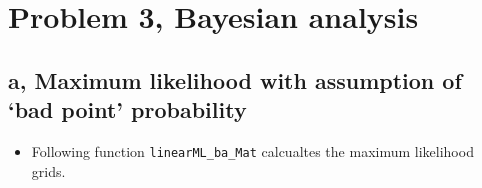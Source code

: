 \documentclass{article}
\newlength{\cellleftmargin}
\newlength{\smallerfontscale}
\def\smaller{\fontsize{\smallerfontscale}{\smallerfontscale}\selectfont}
\begin{document}
\par\vspace{1\smallerfontscale}%
    \begin{addmargin}[\cellleftmargin]{0em}%
    {\smaller%
    \vspace{-1\smallerfontscale}%
    
    \begin{center}
    \end{center}
    { \hspace*{\fill} \\}
    }%
    \end{addmargin}%
    \begin{addmargin}[\cellleftmargin]{0em}%
    {\smaller%
    \vspace{-1\smallerfontscale}%
    
    \begin{center}
    \end{center}
    { \hspace*{\fill} \\}
    }%
    \end{addmargin}%
    \section{Problem 3, Bayesian
analysis}\label{problem-3-bayesian-analysis}

\subsection{a, Maximum likelihood with assumption of `bad point'
probability}\label{a-maximum-likelihood-with-assumption-of-bad-point-probability}

\begin{itemize}
\itemsep1pt\parskip0pt
\item
  Following function \texttt{linearML\_ba\_Mat} calcualtes the maximum
  likelihood grids.
\end{itemize}
\end{document}
